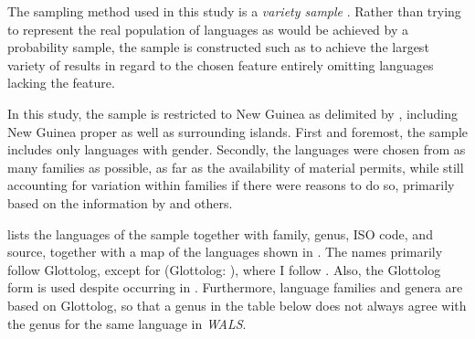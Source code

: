 \documentclass[output=collectionpaper]{langsci/langscibook}
\begin{document}
The sampling method used in this study is a \textit{variety sample} \citep{Bakker2012}. Rather than trying to represent the real population of languages as would be achieved by a probability sample, the sample is constructed such as to achieve the largest variety of results in regard to the chosen feature entirely omitting languages lacking the feature.


In this study, the sample is restricted to New Guinea as delimited by \citet[357]{Foley2000}, including New Guinea proper as well as surrounding islands. First and foremost, the sample includes only languages with gender. Secondly, the languages were chosen from as many families as possible, as far as the availability of material permits, while still accounting for variation within families if there were reasons to do so, primarily based on the information by \citet{Foley2000} and others.



 lists the languages of the sample together with family, genus, ISO code, and source, together with a map of the languages shown in . The names primarily follow Glottolog, except for  (Glottolog: ), where I follow \citet{Onishi1994}. Also, the Glottolog form  is used despite  occurring in \citet{Corris2005}. Furthermore, language families and genera are based on Glottolog, so that a genus in the table below does not always agree with the genus for the same language in \textit{WALS}.
\end{document}
